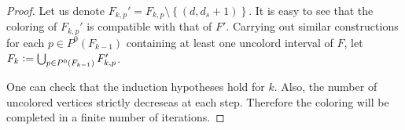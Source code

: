 \documentclass[12pt]{article}
\theoremstyle{definition}
\newcommand{\defeq}{\vcentcolon=}
\begin{document}
\begin{proof}
        Let us denote $F_{k, p}' = 
        F_{k, p} \setminus \left\{
        \left(d, d_{s} + 1\right)\right\}$.
        It is easy to see that the coloring of
        $F_{k, p}'$ is compatible
        with that of
        $F'$.
        Carrying out similar constructions
        for each $p \in P^{0}\left(F_{k-1}\right)$
        containing at least one uncolord
        interval of $F$, let
        $F_{k} \defeq \bigcup_{p \in 
        P^{0}\left(F_{k-1}\right)} F_{k, p}'$.

        One can check that the 
        induction hypotheses hold
        for $k$.
        Also, the number of uncolored
        vertices strictly decreseas 
        at each step. Therefore
        the coloring will be 
        completed in a finite
        number of iterations.
    \end{proof}
\end{document}
